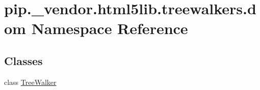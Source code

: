 \hypertarget{namespacepip_1_1__vendor_1_1html5lib_1_1treewalkers_1_1dom}{}\section{pip.\+\_\+vendor.\+html5lib.\+treewalkers.\+dom Namespace Reference}
\label{namespacepip_1_1__vendor_1_1html5lib_1_1treewalkers_1_1dom}
\subsection*{Classes}
\begin{DoxyCompactItemize}
\item 
class \hyperlink{classpip_1_1__vendor_1_1html5lib_1_1treewalkers_1_1dom_1_1TreeWalker}{Tree\+Walker}
\end{DoxyCompactItemize}
